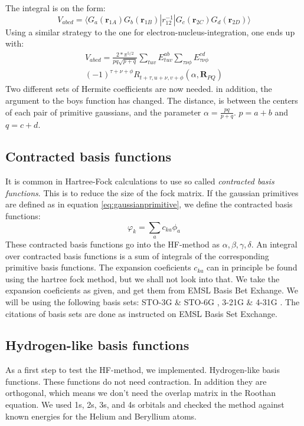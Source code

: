 \documentclass[a4paper,10pt, twocolumn, pre]{revtex4}
\newcommand{\rvec}{\mathbf{r}}
\newcommand{\mb}{\mathbf}
\newcommand{\sandwich}[3]{\langle {#1}|{#2}|{#3}\rangle}
\begin{document}
The integral is on the form:
\begin{equation}
	V_{abcd} = \sandwich{G_a(\rvec_{1A})G_b(\rvec_{1B})}{r_{12}^{-1}}{G_c(\rvec_{2C})G_d(\rvec_{2D})}
\end{equation}
Using a similar strategy to the one for electron-nucleus-integration, one ends up with:
\begin{align}
	V_{abcd} = \frac{2*\pi^{5/2}}{pq\sqrt{p+q}} \sum_{tuv}E_{tuv}^{ab}\sum_{\tau\nu\phi}E_{\tau\nu\phi}^{cd} \nonumber\\
	(-1)^{\tau+\nu+\phi}R_{t+\tau, u+\nu, v+\phi}(\alpha, \mb{R}_{PQ})
\end{align}
Two different sets of Hermite coefficients are now needed. in addition, the argument to the boys function has changed. The distance, is between the centers of each pair of primitive gaussians, and the parameter $\alpha = \frac{pq}{p+q}$. $p = a+b$ and $q = c+d$.

\subsection{Contracted basis functions}
It is common in Hartree-Fock calculations to use so called \emph{contracted basis functions}. This is to reduce the size of the fock matrix. If the gaussian primitives are defined as in equation \ref{eq:gaussianprimitive}, we define the contracted basis functions:
\begin{equation}
	\varphi_k = \sum_a c_{ka} \phi_a
\end{equation}
These contracted basis functions go into the HF-method as $\alpha, \beta, \gamma, \delta$. An integral over contracted basis functions is a sum of integrals of the corresponding primitive basis functions. The expansion coeficients $c_{ka}$ can in principle be found using the hartree fock method, but we shall not look into that. We take the expansion coeficients as given, and get them from EMSL Basis Bet Exhange\cite{Schuchardt2007}. We will be using the following basis sets: STO-3G \& STO-6G \cite{Hehre1969,Hehre1970}, 3-21G \& 4-31G \cite{binkley1980self,gordon1982basis}. The citations of basis sets are done as instructed on EMSL Basis Set Exchange.

\subsection{Hydrogen-like basis functions}
As a first step to test the HF-method, we implemented. Hydrogen-like basis functions. These functions do not need contraction. In addition they are orthogonal, which means we don't need the overlap matrix in the Roothan equation. We used 1s, 2s, 3s, and 4s orbitals and checked the method against known energies for the Helium and Beryllium atoms. 
\end{document}
